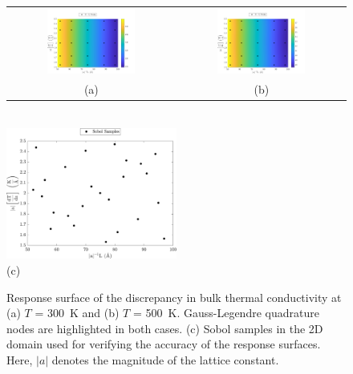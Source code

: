 \begin{figure}[htbp]
\begin{center}
\begin{tabular}{cc}
 \hspace{-10mm}
  \includegraphics[width=0.55\textwidth]{./Figures/err2D_300}
  &
  \includegraphics[width=0.55\textwidth]{./Figures/err2D_500}
  \\ (a) & (b)
  \end{tabular}
  \\ \vspace{1mm}
  \includegraphics[width=0.50\textwidth]{./Figures/err2D_s}
  \\ (c)
\caption{Response surface of the discrepancy in bulk thermal conductivity at (a) $T$ = 300~K and
 (b) $T$ = 500~K. Gauss-Legendre quadrature nodes are highlighted in both cases. (c) Sobol samples
 in the 2D domain used for verifying the accuracy of the response surfaces. Here, $|a|$ denotes the magnitude
 of the lattice constant.}
\label{fig:rs2}
\end{center}
\end{figure}

